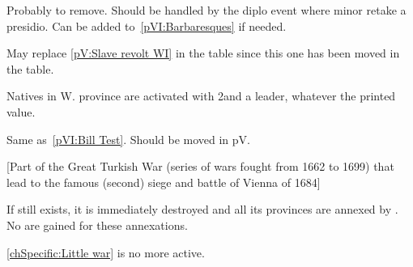 
\begin{todo}
  Probably to remove. Should be handled by the diplo event where minor retake
  a presidio. Can be added to~\ref{pVI:Barbaresques} if needed.
\end{todo}

\begin{todo}
  May replace \ref{pV:Slave revolt WI} in the table since this one has
  been moved in the \REVOLT table.
\end{todo}

\phevnt
\aparag Natives in  W. province are activated with 2\LD and
a leader, whatever the printed value.


Same as~\ref{pVI:Bill Test}. Should be moved in pV.


[Part of the Great Turkish War (series of wars fought from
1662 to 1699) that lead to the famous (second) siege and battle of Vienna of
1684]

\phevnt
\aparag[] [BLP] If \paysHongrie still exists, it is immediately destroyed and
all its provinces are annexed by \AUS. No \VPs are gained for these
annexations.

\aparag[] [BLP] \ref{chSpecific:Little war} is no more active.

\stopevents



